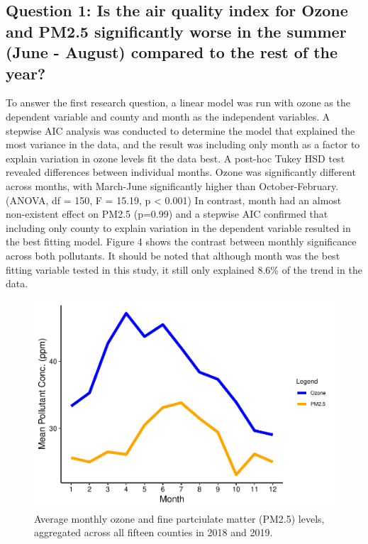 \documentclass[
  12pt,
]{article}
\begin{document}
\hypertarget{question-1-is-the-air-quality-index-for-ozone-and-pm2.5-significantly-worse-in-the-summer-june---august-compared-to-the-rest-of-the-year}{%
\subsection{Question 1: Is the air quality index for Ozone and PM2.5
significantly worse in the summer (June - August) compared to the rest
of the
year?}\label{question-1-is-the-air-quality-index-for-ozone-and-pm2.5-significantly-worse-in-the-summer-june---august-compared-to-the-rest-of-the-year}}

To answer the first research question, a linear model was run with ozone
as the dependent variable and county and month as the independent
variables. A stepwise AIC analysis was conducted to determine the model
that explained the most variance in the data, and the result was
including only month as a factor to explain variation in ozone levels
fit the data best. A post-hoc Tukey HSD test revealed differences
between individual months. Ozone was significantly different across
months, with March-June significantly higher than October-February.
(ANOVA, df = 150, F = 15.19, p \textless{} 0.001) In contrast, month had
an almost non-existent effect on PM2.5 (p=0.99) and a stepwise AIC
confirmed that including only county to explain variation in the
dependent variable resulted in the best fitting model. Figure 4 shows
the contrast between monthly significance across both pollutants. It
should be noted that although month was the best fitting variable tested
in this study, it still only explained 8.6\% of the trend in the data.

\begin{figure}
\centering
\includegraphics{Domeyer_FinalEDA_Sp22_files/figure-latex/results month-1.pdf}
\caption{Average monthly ozone and fine partciulate matter (PM2.5)
levels, aggregated across all fifteen counties in 2018 and 2019.}
\end{figure}
\end{document}
